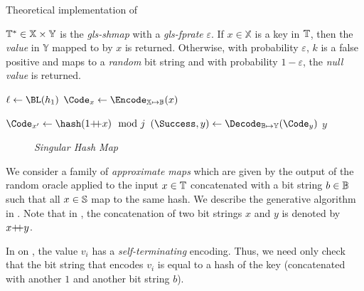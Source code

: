 \documentclass[ ../main.tex]{subfiles}
\begin{document}
\begin{algorithm}[h]
    \caption{Theoretical implementation of \protect\Find}
    \label{alg:shmapfind}
    \KwIn
    {
        $\mathbb{T}^* \in \mathbb{X} \times \mathbb{Y}$ is the \emph{\gls{gls-shmap}} with a \emph{\gls{gls-fprate}} $\varepsilon$.
    }
    \KwOut
    {
        If $x \in \mathbb{X}$ is a key in $\mathbb{T}$, then the \emph{value} in $\mathbb{Y}$ mapped to by $x$ is returned. Otherwise, with probability $\varepsilon$, $k$ is a false positive and maps to a \emph{random} bit string and with probability $1-\varepsilon$, the \emph{null value} is returned.
    }
    
    {
        $\ell \gets \BL(h_1)$\;
        $\Code_x \gets \Encode_{\mathbb{X} \mapsto \cisb}(x)$\;
        {
            \Return \nullvalue\;
        }
        
        
        $\Code_{x'} \gets \hash(1 \catop x) \mod j$\;
        $(\Success, y) \gets \Decode_{\cisb \mapsto \mathbb{Y}}(\Code_y)$\;
        \If{\Success}
        {
            \Return $y$\;
        }
    }
\end{algorithm}


\begin{figure}
    \centering
    \caption{\emph{Singular Hash Map}}
    \label{fig:shmap}
\end{figure}

We consider a family of \emph{approximate maps} which are given by the output of the random oracle applied to the input $x \in \mathbb{T}$ concatenated with a bit string $b \in \mathbb{B}$ such that all $x \in \mathbb{S}$ map to the same hash. We describe the generative algorithm in . Note that in , the concatenation of two bit strings $x$ and $y$ is denoted by $x {+\!\!+} y$.


In  on , the value $v_i$ has a \emph{self-terminating} encoding. Thus, we need only check that the bit string that encodes $v_i$ is equal to a hash of the key (concatenated with another $1$ and another bit string $b$).
\end{document}
